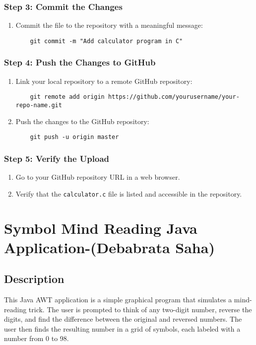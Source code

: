 \documentclass[a4paper,15pt]{article}
\begin{document}
\begin{itemize}[leftmargin=1.5cm]
\subsubsection{Step 3: Commit the Changes}
\begin{enumerate}
    \item Commit the file to the repository with a meaningful message:
    \begin{verbatim}
    git commit -m "Add calculator program in C"
    \end{verbatim}
\end{enumerate}

\subsubsection{Step 4: Push the Changes to GitHub}
\begin{enumerate}
    \item Link your local repository to a remote GitHub repository:
    \begin{verbatim}
    git remote add origin https://github.com/yourusername/your-repo-name.git
    \end{verbatim}
    \item Push the changes to the GitHub repository:
    \begin{verbatim}
    git push -u origin master
    \end{verbatim}
\end{enumerate}

\subsubsection{Step 5: Verify the Upload}
\begin{enumerate}
    \item Go to your GitHub repository URL in a web browser.
    \item Verify that the \texttt{calculator.c} file is listed and accessible in the repository.
\end{enumerate}


\section{Symbol Mind Reading Java Application-(Debabrata Saha)}

\subsection{Description}
This Java AWT application is a simple graphical program that simulates a mind-reading trick. The user is prompted to think of any two-digit number, reverse the digits, and find the difference between the original and reversed numbers. The user then finds the resulting number in a grid of symbols, each labeled with a number from 0 to 98.


\end{itemize}
\end{document}
